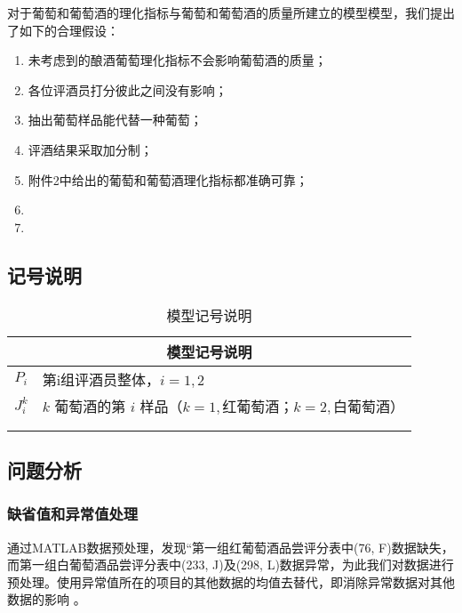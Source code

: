 \documentclass[nocover]{cumcmart}%
\begin{document}
    对于葡萄和葡萄酒的理化指标与葡萄和葡萄酒的质量所建立的模型模型，我们提出了如下的合理假设：
    \begin{enumerate}
        \item 未考虑到的酿酒葡萄理化指标不会影响葡萄酒的质量；
        \item 各位评酒员打分彼此之间没有影响；
        \item 抽出葡萄样品能代替一种葡萄；
        \item 评酒结果采取加分制；
        \item 附件2中给出的葡萄和葡萄酒理化指标都准确可靠；
        \item 
        \item 
    \end{enumerate}

    \subsection{记号说明}

    \begin{table}[!htbp]
        \centering
        \begin{tabular}{cl}
        \toprule
        \multicolumn{2}{c}{\large 模型记号说明}\\
        \midrule
            ${P_i}$         &   第i组评酒员整体，${i = 1,2}$    \\
            ${J_{i}^{k}}$ &   $k$ 葡萄酒的第 $i$ 样品（$k=1,\text{红葡萄酒；} k=2,\text{白葡萄酒}$）  \\ 
             &  \\
             &  \\
            

        \bottomrule
        \end{tabular}
        \caption{模型记号说明}
    \end{table}

    \subsection{问题分析}

        \subsubsection{缺省值和异常值处理}
        通过MATLAB数据预处理，发现“第一组红葡萄酒品尝评分表中(76, F)数据缺失，而第一组白葡萄酒品尝评分表中(233, J)及(298, L)数据异常，为此我们对数据进行预处理。使用异常值所在的项目的其他数据的均值去替代，即消除异常数据对其他数据的影响
。
\end{document}
